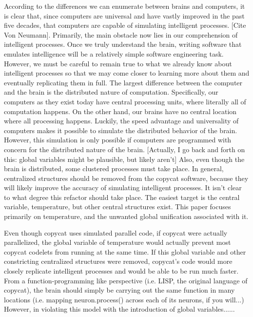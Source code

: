 \documentclass[a4paper]{article}
\begin{document}
    According to the differences we can enumerate between brains and computers, it is clear that, since computers are universal and have vastly improved in the past five decades, that computers are capable of simulating intelligent processes. 
    [Cite Von Neumann]. 
    Primarily, the main obstacle now lies in our comprehension of intelligent processes. 
    Once we truly understand the brain, writing software that emulates intelligence will be a relatively simple software engineering task. 
    However, we must be careful to remain true to what we already know about intelligent processes so that we may come closer to learning more about them and eventually replicating them in full. 
    The largest difference between the computer and the brain is the distributed nature of computation. 
    Specifically, our computers as they exist today have central processing units, where literally all of computation happens. 
    On the other hand, our brains have no central location where all processing happens. 
    Luckily, the speed advantage and universality of computers makes it possible to simulate the distributed behavior of the brain. 
    However, this simulation is only possible if computers are programmed with concern for the distributed nature of the brain.
    [Actually, I go back and forth on this: global variables might be plausible, but likely aren't]
    Also, even though the brain is distributed, some clustered processes must take place.
    In general, centralized structures should be removed from the copycat software, because they will likely improve the accuracy of simulating intelligent processes.
    It isn't clear to what degree this refactor should take place.
    The easiest target is the central variable, temperature, but other central structures exist.
    This paper focuses primarily on temperature, and the unwanted global unification associated with it.

    Even though copycat uses simulated parallel code, if copycat were actually parallelized, the global variable of temperature would actually prevent most copycat codelets from running at the same time.
    If this global variable and other constricting centralized structures were removed, copycat's code would more closely replicate intelligent processes and would be able to be run much faster.
    From a function-programming like perspective (i.e. LISP, the original language of copycat), the brain should simply be carrying out the same function in many locations (i.e. mapping neuron.process() across each of its neurons, if you will...)
    However, in violating this model with the introduction of global variables......
\end{document}
